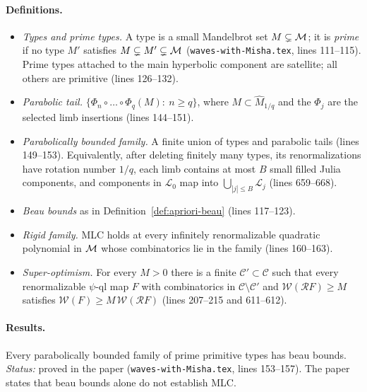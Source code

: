 \paragraph{Definitions.}
\begin{itemize}
\item \emph{Types and prime types.}  A type is a small Mandelbrot set $M\subsetneq\mathcal M$; it is \emph{prime} if no type
$M'$ satisfies $M\subsetneq M'\subsetneq\mathcal M$ (\texttt{waves-with-Misha.tex}, lines 111--115).  Prime types attached to
the main hyperbolic component are satellite; all others are primitive (lines 126--132).
\item \emph{Parabolic tail.}  $\{\Phi_n\circ\dots\circ\Phi_q(M):\ n\ge q\}$, where $M\subset\widehat M_{1/q}$ and the
$\Phi_j$ are the selected limb insertions (lines 144--151).
\item \emph{Parabolically bounded family.}  A finite union of types and parabolic tails (lines 149--153).  Equivalently,
after deleting finitely many types, its renormalizations have rotation number $1/q$, each limb contains at most $B$
small filled Julia components, and components in $\mathcal L_0$ map into $\bigcup_{|j|\le B}\mathcal L_j$
(lines 659--668).
\item \emph{Beau bounds} as in Definition~\ref{def:apriori-beau} (lines 117--123).
\item \emph{Rigid family.}  MLC holds at every infinitely renormalizable quadratic polynomial in $\mathcal M$ whose combinatorics
lie in the family (lines 160--163).
\item \emph{Super-optimism.}  For every $M>0$ there is a finite $\mathcal C'\subset\mathcal C$ such that every renormalizable
$\psi$-ql map $F$ with combinatorics in $\mathcal C\setminus\mathcal C'$ and $\mathcal W(\mathcal RF)\ge M$ satisfies
$\mathcal W(F)\ge M\,\mathcal W(\mathcal RF)$ (lines 207--215 and 611--612).
\end{itemize}

\paragraph{Results.}

\begin{theorem}[Theorem A]
\label{thm:kkl-A}
Every parabolically bounded family of prime primitive types has beau bounds.  \emph{Status:} proved in the paper
(\texttt{waves-with-Misha.tex}, lines 153--157).  The paper states that beau bounds alone do not establish MLC.
\end{theorem}

